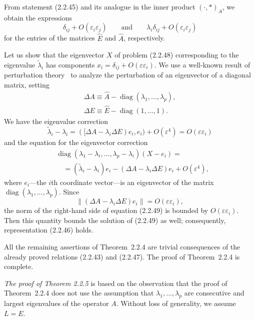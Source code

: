 \documentclass[11pt,oneside]{book}
\newcommand{\diag}{\operatorname{diag}}
\begin{document}
From statement (2.2.45) and its analogue in the inner product $(\cdot, *)_A$, we obtain the expressions
\[
\delta_{ij} + O(\varepsilon_i \varepsilon_j) \qquad \text{and} \qquad \lambda_i \delta_{ij} + O(\varepsilon_i \varepsilon_j)
\]
for the entries of the matrices $\widehat{E}$ and $\widehat{A}$, respectively.

Let us show that the eigenvector $X$ of problem (2.2.48) corresponding to the eigenvalue $\tilde{\lambda}_i$ has components $x_i = \delta_{ij} + O(\varepsilon \varepsilon_i)$. %
We use a well-known result of perturbation theory~\citep[\S\,24]{Collatz1968ru} to analyze the perturbation of an eigenvector of a diagonal matrix, setting
\begin{gather*}
\Delta A \equiv \widehat{A} - \diag(\lambda_1, \ldots, \lambda_p), \\
\Delta E \equiv \widehat{E} - \diag(1, \ldots, 1).
\end{gather*}
We have the eigenvalue correction
\[
\tilde{\lambda}_i - \lambda_i = ([\Delta A - \lambda_i \Delta E) e_i, e_i) + O(\varepsilon^4) = O(\varepsilon \varepsilon_i) %
\]
and the equation for the eigenvector correction
\[
\begin{aligned}
&\diag(\lambda_1 - \lambda_i, \ldots, \lambda_p - \lambda_i)(X - e_i) = \\
&\quad = (\tilde{\lambda}_i - \lambda_i) e_i - (\Delta A - \lambda_i \Delta E) e_i + O(\varepsilon^4),
\end{aligned} \tag{2.2.49}
\]
where $e_i$---the $i$th coordinate vector---is an eigenvector of the matrix $\diag(\lambda_1, \ldots, \lambda_p)$. Since
\[
\|(\Delta A - \lambda_i \Delta E) e_i\| = O(\varepsilon \varepsilon_i),
\]
the norm of the right-hand side of equation (2.2.49) is bounded by $O(\varepsilon \varepsilon_i)$. Then this quantity bounds the solution of (2.2.49) as well; consequently, representation (2.2.46) holds.

All the remaining assertions of Theorem~2.2.4 are trivial consequences of the already proved relations (2.2.43) and (2.2.47). The proof of Theorem~2.2.4 is complete.

\textit{The proof of Theorem 2.2.5} is based on the observation that the proof of Theorem~2.2.4 does not use the assumption that $\lambda_1, \ldots, \lambda_p$ are consecutive and largest eigenvalues of the operator $A$. Without loss of generality, we assume $L = E$.
\end{document}
